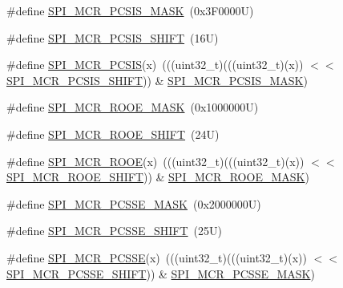 \begin{DoxyCompactItemize}
\item 
\#define \mbox{\hyperlink{group___c_a_n___register___masks_ga69de8a51e829efc59b2a2402a8210aeb}{S\+P\+I\+\_\+\+M\+C\+R\+\_\+\+P\+C\+S\+I\+S\+\_\+\+M\+A\+SK}}~(0x3\+F0000\+U)
\item 
\#define \mbox{\hyperlink{group___c_a_n___register___masks_ga5130ba4524baa3be71b17af17b06b3e2}{S\+P\+I\+\_\+\+M\+C\+R\+\_\+\+P\+C\+S\+I\+S\+\_\+\+S\+H\+I\+FT}}~(16\+U)
\item 
\#define \mbox{\hyperlink{group___c_a_n___register___masks_ga81637c9ef8f34bdb499086de99c99858}{S\+P\+I\+\_\+\+M\+C\+R\+\_\+\+P\+C\+S\+IS}}(x)~(((uint32\+\_\+t)(((uint32\+\_\+t)(x)) $<$$<$ \mbox{\hyperlink{group___c_a_n___register___masks_ga5130ba4524baa3be71b17af17b06b3e2}{S\+P\+I\+\_\+\+M\+C\+R\+\_\+\+P\+C\+S\+I\+S\+\_\+\+S\+H\+I\+FT}})) \& \mbox{\hyperlink{group___c_a_n___register___masks_ga69de8a51e829efc59b2a2402a8210aeb}{S\+P\+I\+\_\+\+M\+C\+R\+\_\+\+P\+C\+S\+I\+S\+\_\+\+M\+A\+SK}})
\item 
\#define \mbox{\hyperlink{group___c_a_n___register___masks_ga2f3c41dcffc0058ae83ae7b1dbfffd86}{S\+P\+I\+\_\+\+M\+C\+R\+\_\+\+R\+O\+O\+E\+\_\+\+M\+A\+SK}}~(0x1000000\+U)
\item 
\#define \mbox{\hyperlink{group___c_a_n___register___masks_ga78f4dfaad41aae2ee10979f2e248e4d3}{S\+P\+I\+\_\+\+M\+C\+R\+\_\+\+R\+O\+O\+E\+\_\+\+S\+H\+I\+FT}}~(24\+U)
\item 
\#define \mbox{\hyperlink{group___c_a_n___register___masks_ga976b4b71102dac6e646d34dc6f91351b}{S\+P\+I\+\_\+\+M\+C\+R\+\_\+\+R\+O\+OE}}(x)~(((uint32\+\_\+t)(((uint32\+\_\+t)(x)) $<$$<$ \mbox{\hyperlink{group___c_a_n___register___masks_ga78f4dfaad41aae2ee10979f2e248e4d3}{S\+P\+I\+\_\+\+M\+C\+R\+\_\+\+R\+O\+O\+E\+\_\+\+S\+H\+I\+FT}})) \& \mbox{\hyperlink{group___c_a_n___register___masks_ga2f3c41dcffc0058ae83ae7b1dbfffd86}{S\+P\+I\+\_\+\+M\+C\+R\+\_\+\+R\+O\+O\+E\+\_\+\+M\+A\+SK}})
\item 
\#define \mbox{\hyperlink{group___c_a_n___register___masks_ga479a7a3131d4356e53f7f86bd4cd0245}{S\+P\+I\+\_\+\+M\+C\+R\+\_\+\+P\+C\+S\+S\+E\+\_\+\+M\+A\+SK}}~(0x2000000\+U)
\item 
\#define \mbox{\hyperlink{group___c_a_n___register___masks_ga4dc49f49441cc797619c160757bd7d2d}{S\+P\+I\+\_\+\+M\+C\+R\+\_\+\+P\+C\+S\+S\+E\+\_\+\+S\+H\+I\+FT}}~(25\+U)
\item 
\#define \mbox{\hyperlink{group___c_a_n___register___masks_ga17a788925747b7b947327e528b87ba1c}{S\+P\+I\+\_\+\+M\+C\+R\+\_\+\+P\+C\+S\+SE}}(x)~(((uint32\+\_\+t)(((uint32\+\_\+t)(x)) $<$$<$ \mbox{\hyperlink{group___c_a_n___register___masks_ga4dc49f49441cc797619c160757bd7d2d}{S\+P\+I\+\_\+\+M\+C\+R\+\_\+\+P\+C\+S\+S\+E\+\_\+\+S\+H\+I\+FT}})) \& \mbox{\hyperlink{group___c_a_n___register___masks_ga479a7a3131d4356e53f7f86bd4cd0245}{S\+P\+I\+\_\+\+M\+C\+R\+\_\+\+P\+C\+S\+S\+E\+\_\+\+M\+A\+SK}})
$$
\end{DoxyCompactItemize}
